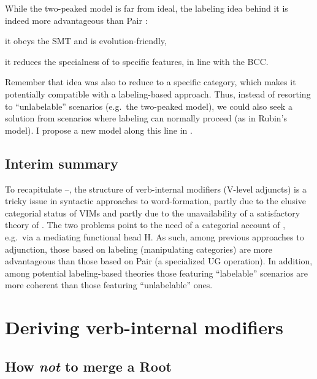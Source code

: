 \documentclass[output=paper]{langsci/langscibook}
\begin{document}
While the two-peaked model is far from ideal, the labeling idea behind it is
indeed more advantageous than Pair :
%
\begin{inparaenum}[(i)]
    \item it obeys the \gls{SMT} and is evolution-friendly,
    \item it reduces the specialness of  to specific features, in line
        with the BCC.
\end{inparaenum}
%
Remember that  idea was also to reduce  to a
specific category, which makes it potentially compatible with a labeling-based
approach. Thus, instead of resorting to ``unlabelable'' scenarios (e.g.\ the
two-peaked model), we could also seek a solution from scenarios where labeling
can normally proceed (as in Rubin's model). I propose a new model along this
line in .

\subsection{Interim summary}\label{sec3.3}

To recapitulate --, the structure of verb-internal
modifiers (V-level adjuncts) is a tricky issue in syntactic approaches to
word-formation, partly due to the elusive categorial status of \glspl{VIM} and
partly due to the unavailability of a satisfactory theory of . The
two problems point to the need of a categorial account of , e.g.\ via
a mediating functional head H. As such, among previous approaches to
adjunction, those based on labeling (manipulating categories) are more
advantageous than those based on Pair  (a specialized \gls{UG} operation).
In addition, among potential labeling-based theories those featuring
``labelable'' scenarios are more coherent than those featuring ``unlabelable''
ones.

\section{Deriving verb-internal modifiers}\label{sec4}

\subsection{How \emph{not} to merge a Root}\label{sec4.1}
\end{document}
